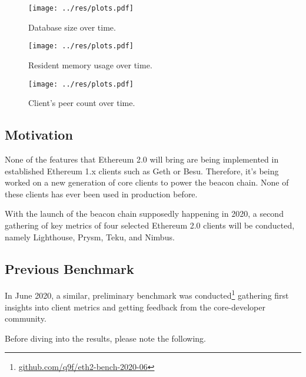 \documentclass[twoside,twocolumn]{article}
\begin{document}
\begin{figure}[t]
	\centering
	\texttt{[image: ../res/plots.pdf]}
	\caption{Database size over time.}
	\label{img:db}
\end{figure}

\begin{figure}[t]
	\centering
	\texttt{[image: ../res/plots.pdf]}
	\caption{Resident memory usage over time.}
	\label{img:mem}
\end{figure}

\begin{figure}[t]
	\centering
	\texttt{[image: ../res/plots.pdf]}
	\caption{Client's peer count over time.}
	\label{img:per}
\end{figure}

\subsection{Motivation}
None of the features that Ethereum 2.0 will bring are being implemented in established Ethereum 1.x clients such as Geth or Besu. Therefore, it's being worked on a new generation of core clients to power the beacon chain. None of these clients has ever been used in production before.\par

With the launch of the beacon chain supposedly happening in 2020, a second gathering of key metrics of four selected Ethereum 2.0 clients will be conducted, namely Lighthouse, Prysm, Teku, and Nimbus.\par

\subsection{Previous Benchmark}
In June 2020, a similar, preliminary benchmark was conducted\footnote{\href{https://github.com/q9f/eth2-bench-2020-06}{github.com/q9f/eth2-bench-2020-06}} gathering first insights into client metrics and getting feedback from the core-developer community.\par

Before diving into the results, please note the following.
\end{document}
